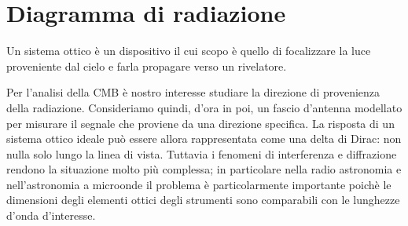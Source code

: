 \documentclass[12pt,a4paper,final]{book}
\begin{document}
\section{Diagramma di radiazione}\label{rad_pattern}
Un sistema ottico è un dispositivo il cui scopo è quello di focalizzare la luce proveniente dal cielo e farla propagare verso un rivelatore.


Per l'analisi della CMB è nostro interesse studiare la direzione di provenienza della radiazione. Consideriamo quindi, d'ora in poi, un fascio d'antenna modellato per misurare il segnale che proviene da una direzione specifica.
La risposta di un sistema ottico ideale può essere allora rappresentata come una delta di Dirac: non nulla solo lungo la linea di vista.
Tuttavia i fenomeni di interferenza e diffrazione rendono la situazione molto più complessa; in particolare nella radio astronomia e nell'astronomia a microonde il problema è particolarmente importante poichè le dimensioni degli elementi ottici degli strumenti sono comparabili con le lunghezze d'onda d'interesse.
\end{document}
